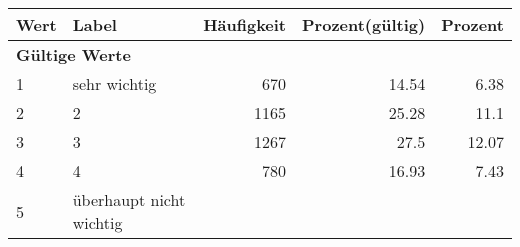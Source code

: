      \begin{longtable}{lXrrr}
     \toprule
     \textbf{Wert} & \textbf{Label} & \textbf{Häufigkeit} & \textbf{Prozent(gültig)} & \textbf{Prozent} \\
     \endhead
     \midrule
     \multicolumn{5}{l}{\textbf{Gültige Werte}}\\

     1 &
     \multicolumn{1}{X}{ sehr wichtig   } &


       \num{670} &
       \num[round-mode=places,round-precision=2]{14,54} &
         \num[round-mode=places,round-precision=2]{6,38} \\

     2 &
     \multicolumn{1}{X}{ 2   } &


       \num{1165} &
       \num[round-mode=places,round-precision=2]{25,28} &
         \num[round-mode=places,round-precision=2]{11,1} \\

     3 &
     \multicolumn{1}{X}{ 3   } &


       \num{1267} &
       \num[round-mode=places,round-precision=2]{27,5} &
         \num[round-mode=places,round-precision=2]{12,07} \\

     4 &
     \multicolumn{1}{X}{ 4   } &


       \num{780} &
       \num[round-mode=places,round-precision=2]{16,93} &
         \num[round-mode=places,round-precision=2]{7,43} \\

     5 &
     \multicolumn{1}{X}{ überhaupt nicht wichtig   } &



\end{longtable}

